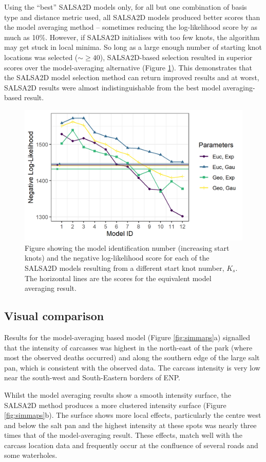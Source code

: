 \documentclass[letterpaper]{interact}
\begin{document}
Using the ``best'' SALSA2D models only, for all but one combination of basis type and distance metric used, all SALSA2D models produced better scores than the model averaging method -- sometimes reducing the log-likelihood score by as much as 10\%. However, if SALSA2D initialises with too few knots, the algorithm may get stuck in local minima. So long as a large enough number of starting knot locations was selected ($\sim\geq 40$), SALSA2D-based selection resulted in superior scores over the model-averaging alternative (Figure \ref{fig:simresults}). This demonstrates that the SALSA2D model selection method can return improved results and at worst, SALSA2D results were almost indistinguishable from the best model averaging-based result.

\begin{figure}[!ht]
\centering
\includegraphics[width=0.7\linewidth]{images/simulationscores.jpg}
\caption{Figure showing the model identification number (increasing start knots) and the negative log-likelihood score for each of the SALSA2D models resulting from a different start knot number, $K_s$. The horizontal lines are the scores for the equivalent model averaging result.}
\label{fig:simresults}
\end{figure}


\subsection{Visual comparison}\label{visual-comparison}

Results for the model-averaging based model (Figure \ref{fig:simmaps}a) signalled that the intensity of carcasses was highest in the north-east of the park (where most the observed deaths occurred) and along the southern edge of the large salt pan, which is consistent with the observed data. The carcass intensity is very low near the south-west and South-Eastern borders of ENP.

Whilst the model averaging results show a smooth intensity surface, the SALSA2D method produces a more clustered intensity surface (Figure \ref{fig:simmaps}b). The surface shows more local effects, particularly the centre west and below the salt pan and the highest intensity at these spots was nearly three times that of the model-averaging result. These effects, match well with the carcass location data and frequently occur at the confluence of several roads and some waterholes. 
\end{document}
